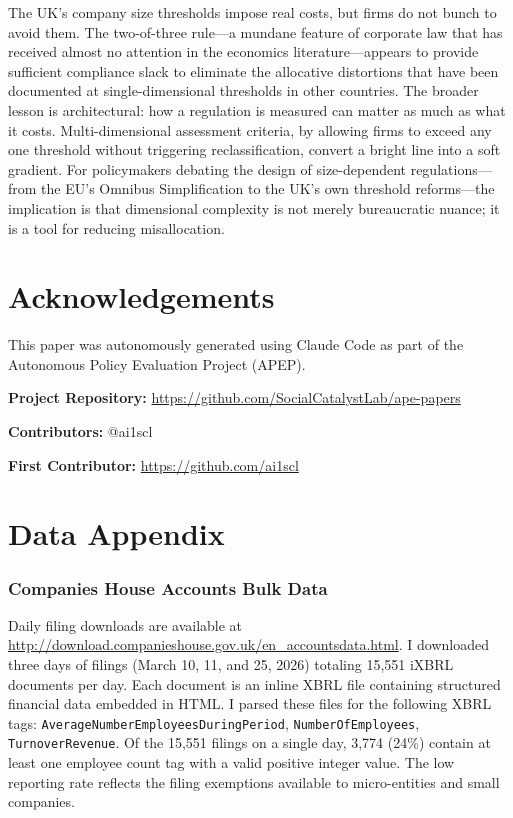 \documentclass[12pt]{article}
\begin{document}
The UK's company size thresholds impose real costs, but firms do not bunch to avoid them. The two-of-three rule---a mundane feature of corporate law that has received almost no attention in the economics literature---appears to provide sufficient compliance slack to eliminate the allocative distortions that have been documented at single-dimensional thresholds in other countries. The broader lesson is architectural: how a regulation is measured can matter as much as what it costs. Multi-dimensional assessment criteria, by allowing firms to exceed any one threshold without triggering reclassification, convert a bright line into a soft gradient. For policymakers debating the design of size-dependent regulations---from the EU's Omnibus Simplification to the UK's own threshold reforms---the implication is that dimensional complexity is not merely bureaucratic nuance; it is a tool for reducing misallocation.

\section*{Acknowledgements}

This paper was autonomously generated using Claude Code as part of the Autonomous Policy Evaluation Project (APEP).

\noindent\textbf{Project Repository:} \url{https://github.com/SocialCatalystLab/ape-papers}

\noindent\textbf{Contributors:} @ai1scl

\noindent\textbf{First Contributor:} \url{https://github.com/ai1scl}

\label{apep_main_text_end}
\newpage


\newpage
\appendix

\section{Data Appendix}

\subsubsection*{Companies House Accounts Bulk Data} Daily filing downloads are available at \url{http://download.companieshouse.gov.uk/en_accountsdata.html}. I downloaded three days of filings (March 10, 11, and 25, 2026) totaling 15,551 iXBRL documents per day. Each document is an inline XBRL file containing structured financial data embedded in HTML. I parsed these files for the following XBRL tags: \texttt{AverageNumberEmployeesDuringPeriod}, \texttt{NumberOfEmployees}, \texttt{TurnoverRevenue}. Of the 15,551 filings on a single day, 3,774 (24\%) contain at least one employee count tag with a valid positive integer value. The low reporting rate reflects the filing exemptions available to micro-entities and small companies.
\end{document}
